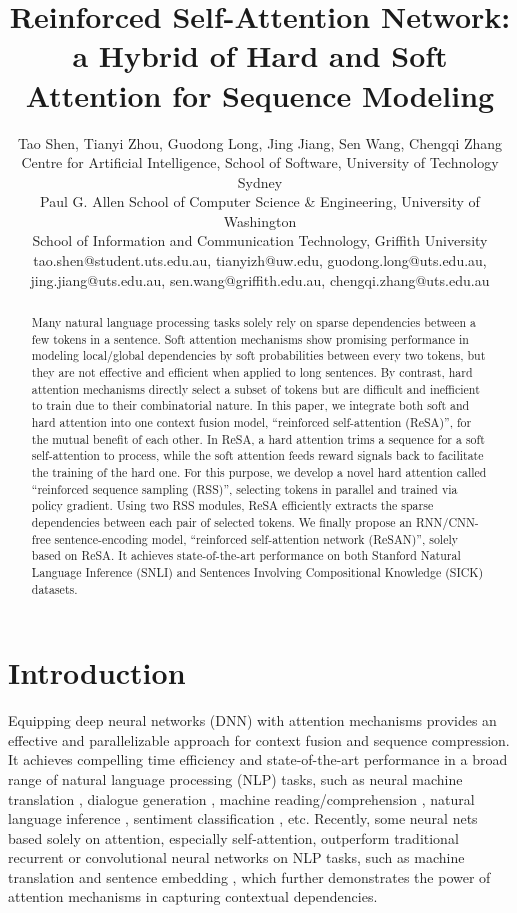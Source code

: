 \documentclass{article}
\title{Reinforced Self-Attention Network:\\a Hybrid of Hard and Soft Attention for Sequence Modeling}
\author{
Tao Shen, 
Tianyi Zhou, 
Guodong Long, 
Jing Jiang, 
Sen Wang, 
Chengqi Zhang
\\ 
 Centre for Artificial Intelligence, School of Software, University of Technology Sydney \\
 Paul G. Allen School of Computer Science \& Engineering, University of Washington\\
 School of Information and Communication Technology, Griffith University  \\
tao.shen@student.uts.edu.au, tianyizh@uw.edu, guodong.long@uts.edu.au, \\
jing.jiang@uts.edu.au, sen.wang@griffith.edu.au, chengqi.zhang@uts.edu.au
}
\begin{document}
\maketitle

\begin{abstract}
Many natural language processing tasks solely rely on sparse dependencies between a few tokens in a sentence. Soft attention mechanisms show promising performance in modeling local/global dependencies by soft probabilities between every two tokens, but they are not effective and efficient when applied to long sentences. By contrast, hard attention mechanisms directly select a subset of tokens but are difficult and inefficient to train due to their combinatorial nature. In this paper, we integrate both soft and hard attention into one context fusion model, ``reinforced self-attention (ReSA)'', for the mutual benefit of each other. In ReSA, a hard attention trims a sequence for a soft self-attention to process, while the soft attention feeds reward signals back to facilitate the training of the hard one. For this purpose, we develop a novel hard attention called ``reinforced sequence sampling (RSS)'', selecting tokens in parallel and trained via policy gradient. Using two RSS modules, ReSA efficiently extracts the sparse dependencies between each pair of selected tokens. We finally propose an RNN/CNN-free sentence-encoding model, ``reinforced self-attention network (ReSAN)'', solely based on ReSA.  It achieves state-of-the-art performance on both Stanford Natural Language Inference (SNLI) and Sentences Involving Compositional Knowledge (SICK) datasets. 
\end{abstract}

	\section{Introduction}

Equipping deep neural networks (DNN) with attention mechanisms provides an effective and parallelizable approach for context fusion and sequence compression. It achieves compelling time efficiency and state-of-the-art performance in a broad range of natural language processing (NLP) tasks, such as neural machine translation \cite{bahdanau2015neural,luong2015effective}, dialogue generation \cite{shang2015neural}, machine reading/comprehension \cite{seo2017bidirectional}, natural language inference \cite{liu2016learning}, sentiment classification \cite{li2017adversarial}, etc. Recently, some neural nets based solely on attention, especially self-attention, outperform traditional recurrent \cite{bowman2015snli} or convolutional  \cite{dong2017more} neural networks on NLP tasks, such as machine translation \cite{vaswani2017attention} and sentence embedding \cite{shen2017disan}, which further demonstrates the power of attention mechanisms in capturing contextual dependencies. 
\end{document}
